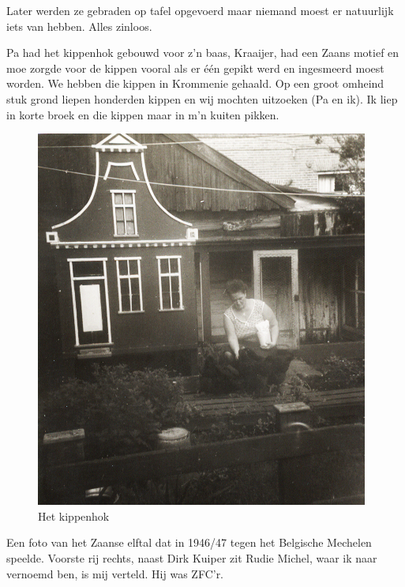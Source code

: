 \documentclass[12pt,twoside, openright]{memoir}
\begin{document}
Later werden ze gebraden op tafel opgevoerd maar niemand moest er natuurlijk iets van hebben. Alles zinloos. 

Pa had het kippenhok gebouwd voor z’n baas, Kraaijer, had een Zaans motief en moe zorgde voor de kippen vooral als er één gepikt werd en ingesmeerd moest worden. We hebben die kippen in Krommenie gehaald. Op een groot omheind stuk grond liepen honderden kippen en wij mochten uitzoeken (Pa en ik). Ik liep in korte broek en die kippen maar in m’n kuiten pikken. 

\begin{figure}
\includegraphics[width=\textwidth]{img/ch5/kippenhok}
\caption*{\footnotesize Het kippenhok}
\end{figure}

Een foto van het Zaanse elftal dat in 1946/47 tegen het Belgische Mechelen speelde. Voorste rij rechts, naast Dirk Kuiper zit Rudie Michel, waar ik naar vernoemd ben, is mij verteld. Hij was ZFC’r. 
\end{document}
